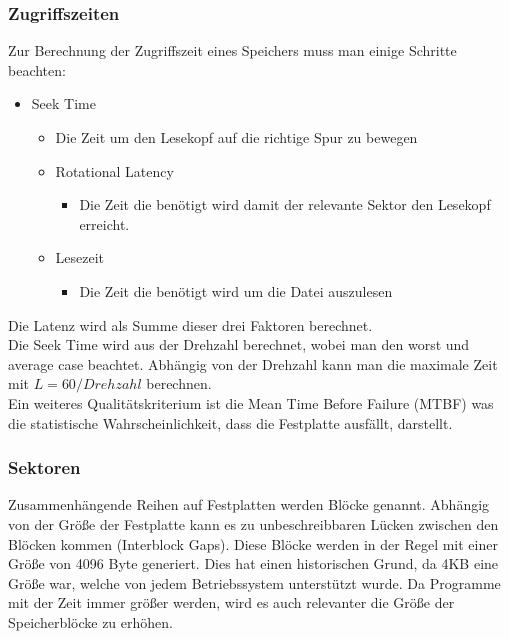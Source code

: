 \documentclass{article}
\begin{document}
	\subsubsection{Zugriffszeiten}
	Zur Berechnung der Zugriffszeit eines Speichers muss man einige Schritte beachten: 
	\begin{itemize}
		\item{Seek Time}
		\begin{itemize}
			\item{Die Zeit um den Lesekopf auf die richtige Spur zu bewegen}
		\end{itemize}
		\begin{itemize}
			\item{Rotational Latency}
			\begin{itemize}
				\item{Die Zeit die benötigt wird damit der relevante Sektor den Lesekopf erreicht.}
			\end{itemize}
			\item{Lesezeit}
			\begin{itemize}
				\item{Die Zeit die benötigt wird um die Datei auszulesen}
			\end{itemize}
		\end{itemize}
	\end{itemize}
	Die Latenz wird als Summe dieser drei Faktoren berechnet. \\
	Die Seek Time wird aus der Drehzahl berechnet, wobei man den worst und average case beachtet. Abhängig von der Drehzahl kann man die maximale Zeit mit $L=60/Drehzahl$ berechnen. \\
	Ein weiteres Qualitätskriterium ist die Mean Time Before Failure (MTBF) was die statistische Wahrscheinlichkeit, dass die Festplatte ausfällt, darstellt. \\
	\subsubsection{Sektoren}
	Zusammenhängende Reihen auf Festplatten werden Blöcke genannt. Abhängig von der Größe der Festplatte kann es zu unbeschreibbaren Lücken zwischen den Blöcken kommen (Interblock Gaps). Diese Blöcke werden in der Regel mit einer Größe von 4096 Byte generiert. Dies hat einen historischen Grund, da 4KB eine Größe war, welche von jedem Betriebssystem unterstützt wurde. Da Programme mit der Zeit immer größer werden, wird es auch relevanter die Größe der Speicherblöcke zu erhöhen.
\end{document}
